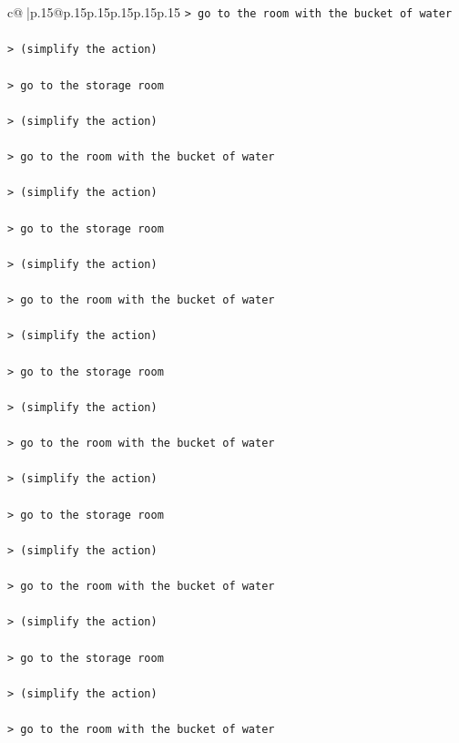 \documentclass{article}
\begin{document}
{\begin{supertabular}{c@{$\;$}|p{.15\linewidth}@{}p{.15\linewidth}p{.15\linewidth}p{.15\linewidth}p{.15\linewidth}p{.15\linewidth}}
{{{\texttt{> go to the room with the bucket of water } \\
\\ 
\texttt{> (simplify the action) } \\
\\ 
\texttt{> go to the storage room } \\
\\ 
\texttt{> (simplify the action) } \\
\\ 
\texttt{> go to the room with the bucket of water } \\
\\ 
\texttt{> (simplify the action) } \\
\\ 
\texttt{> go to the storage room } \\
\\ 
\texttt{> (simplify the action) } \\
\\ 
\texttt{> go to the room with the bucket of water } \\
\\ 
\texttt{> (simplify the action) } \\
\\ 
\texttt{> go to the storage room } \\
\\ 
\texttt{> (simplify the action) } \\
\\ 
\texttt{> go to the room with the bucket of water } \\
\\ 
\texttt{> (simplify the action) } \\
\\ 
\texttt{> go to the storage room } \\
\\ 
\texttt{> (simplify the action) } \\
\\ 
\texttt{> go to the room with the bucket of water } \\
\\ 
\texttt{> (simplify the action) } \\
\\ 
\texttt{> go to the storage room } \\
\\ 
\texttt{> (simplify the action) } \\
\\ 
\texttt{> go to the room with the bucket of water } \\
}}}
\end{supertabular}}
\end{document}
